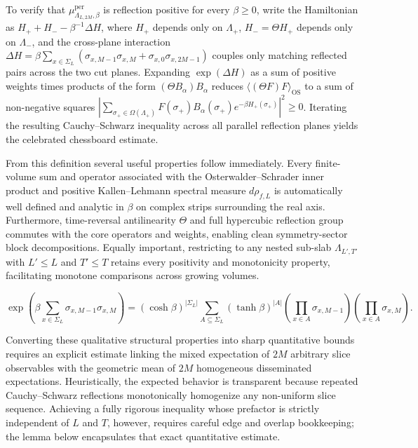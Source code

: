 \documentclass[11pt]{article}
\theoremstyle{definition}
\begin{document}
To verify that $\mu_{\Lambda_{L,2M},\beta}^{\mathrm{per}}$ is reflection positive
for every $\beta \ge 0$, write the Hamiltonian as $H_+ + H_- - \beta^{-1} \Delta H$,
where $H_+$ depends only on $\Lambda_+$, $H_- = \Theta H_+$ depends only on
$\Lambda_-$, and the cross-plane interaction $\Delta H = \beta \sum_{x \in \Sigma_L}
(\sigma_{x, M-1} \sigma_{x, M} + \sigma_{x, 0} \sigma_{x, 2M-1})$ couples only
matching reflected pairs across the two cut planes. Expanding $\exp(\Delta H)$ as a
sum of positive weights times products of the form $(\Theta B_\alpha) B_\alpha$
reduces $\langle (\Theta F) F \rangle_{\mathrm{OS}}$ to a sum of non-negative
squares $|\sum_{\sigma_+ \in \Omega(\Lambda_+)} F(\sigma_+) B_\alpha(\sigma_+)
e^{-\beta H_+(\sigma_+)}|^2 \ge 0$. Iterating the resulting Cauchy--Schwarz
inequality across all parallel reflection planes yields the celebrated chessboard
estimate.

From this definition several useful properties follow immediately. Every
finite-volume sum and operator associated with the Osterwalder--Schrader inner
product and positive Kallen--Lehmann spectral measure $d\rho_{f,L}$ is automatically
well defined and analytic in $\beta$ on complex strips surrounding the real axis.
Furthermore, time-reversal antilinearity $\Theta$ and full hypercubic reflection
group commutes with the core operators and weights, enabling clean symmetry-sector
block decompositions. Equally important, restricting to any nested sub-slab
$\Lambda_{L',T'}$ with $L' \le L$ and $T' \le T$ retains every positivity and
monotonicity property, facilitating monotone comparisons across growing volumes.

\[
  \exp\!\left(\beta \sum_{x \in \Sigma_L} \sigma_{x, M-1} \sigma_{x, M}\right) = (\cosh \beta)^{|\Sigma_L|} \sum_{A \subseteq \Sigma_L} (\tanh \beta)^{|A|} \left(\prod_{x \in A} \sigma_{x, M-1}\right) \left(\prod_{x \in A} \sigma_{x, M}\right).
\]

Converting these qualitative structural properties into sharp quantitative bounds
requires an explicit estimate linking the mixed expectation of $2M$ arbitrary slice
observables with the geometric mean of $2M$ homogeneous disseminated expectations.
Heuristically, the expected behavior is transparent because repeated Cauchy--Schwarz
reflections monotonically homogenize any non-uniform slice sequence. Achieving a
fully rigorous inequality whose prefactor is strictly independent of $L$ and $T$,
however, requires careful edge and overlap bookkeeping; the lemma below encapsulates
that exact quantitative estimate.
\end{document}
